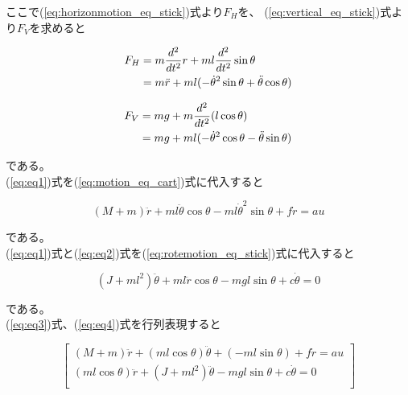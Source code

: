 	ここで(\ref{eq:horizonmotion_eq_stick})式より$F_{H}$を、
	(\ref{eq:vertical_eq_stick})式より$F_{V}$を求めると
	
	\begin{align}
		F_{H} &= m\frac{d^{2}}{dt^{2}}r + ml\frac{d^{2}}{dt^{2}}\sin{\theta} \notag \\
		&= m\ddot{r}+ml(-\dot{\theta}^{2}\sin{\theta}+\ddot{\theta}\cos{\theta})
		\label{eq:eq1}
	\end{align}
	
	\begin{align}
		F_{V} &= mg + m\frac{d^{2}}{dt^{2}}(l\cos{\theta}) \notag \\
		&= mg + ml(-\dot{\theta}^{2}\cos{\theta}-\ddot{\theta}\sin{\theta})
		\label{eq:eq2}
	\end{align}
	
	である。\\
	(\ref{eq:eq1})式を(\ref{eq:motion_eq_cart})式に代入すると
	
	\begin{equation}
		(M+m)\ddot{r} + ml\ddot{\theta}\cos{\theta}-ml\dot{\theta}^{2}\sin{\theta}+f\dot{r}=au
		\label{eq:eq3}
	\end{equation}
	
	である。\\
	(\ref{eq:eq1})式と(\ref{eq:eq2})式を(\ref{eq:rotemotion_eq_stick})式に代入すると
	
	\begin{equation}
		(J + ml^{2})\ddot{\theta} + ml\ddot{r}\cos{\theta} - mgl\sin{\theta} + c\dot{\theta} = 0
		\label{eq:eq4}
	\end{equation}
	
	である。\\
	(\ref{eq:eq3})式、(\ref{eq:eq4})式を行列表現すると
	
	\[
		\left[
		\begin{array}{ccc}
			(M + m)\ddot{r} + (ml\cos{\theta})\ddot{\theta} + (-ml\sin{\theta}) + f\dot{r} = au \\
			(ml\cos{\theta})\ddot{r} + (J + ml^{2})\ddot{\theta} -mgl\sin{\theta} + c\dot{\theta} = 0\\
		\end{array}
		\right]
	\]
	

